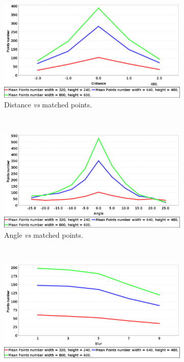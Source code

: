 \begin{figure}[h!]
        \centering
        \begin{subfigure}[b]{0.45\textwidth}
	    \includegraphics[width=\textwidth]{distVsMatches}
	  \caption{Distance \emph{vs} matched points.}\label{fig:cp01_distance_vs_matched}
        \end{subfigure}%
        ~
        \begin{subfigure}[b]{0.45\textwidth}
	    \includegraphics[width=\textwidth]{angleVsMatches}
	  \caption{Angle \emph{vs} matched points.}\label{fig:cp01_angle_vs_matched}
        \end{subfigure}%
        \\
        \begin{subfigure}[b]{0.45\textwidth}
	    \includegraphics[width=\textwidth]{blurVsMatches}

\end{subfigure}
\end{figure}

